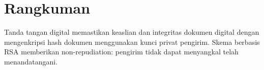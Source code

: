 \section*{Rangkuman}
Tanda tangan digital memastikan keaslian dan integritas dokumen digital dengan mengenkripsi hash dokumen menggunakan kunci privat pengirim. Skema berbasis RSA memberikan non-repudiation: pengirim tidak dapat menyangkal telah menandatangani.
